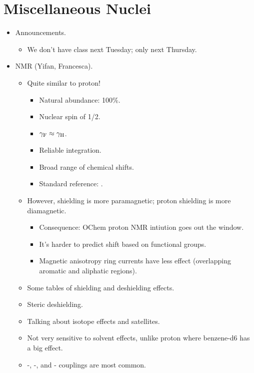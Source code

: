 \documentclass[../notes.tex]{subfiles}
\begin{document}
\section{Miscellaneous Nuclei}
\begin{itemize}
    \item {}Announcements.
    \begin{itemize}
        \item We don't have class next Tuesday; only next Thursday.
    \end{itemize}
    \item {} NMR (Yifan, Francesca).
    \begin{itemize}
        \item Quite similar to proton!
        \begin{itemize}
            \item Natural abundance: 100\%.
            \item Nuclear spin of 1/2.
            \item $\gamma_{\ce{F}}\approx\gamma_{\ce{H}}$.
            \item Reliable integration.
            \item Broad range of chemical shifts.
            \item Standard reference: .
        \end{itemize}
        \item However, shielding is more paramagnetic; proton shielding is more diamagnetic.
        \begin{itemize}
            \item Consequence: OChem proton NMR intiution goes out the window.
            \item It's harder to predict shift based on functional groups.
            \item Magnetic anisotropy ring currents have less effect (overlapping aromatic and aliphatic regions).
        \end{itemize}
        \item Some tables of shielding and deshielding effects.
        \item Steric deshielding.
        \item Talking about isotope effects and satellites.
        \item Not very sensitive to solvent effects, unlike proton where benzene-d6 has a big effect.
        \item {}-, -, and - couplings are most common.

\end{itemize}
\end{itemize}
\end{document}

